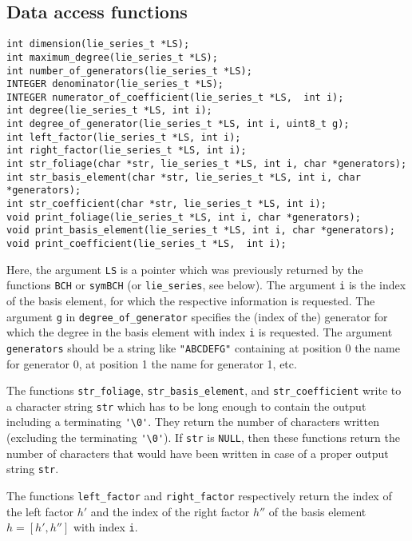 \documentclass[11pt,a4paper]{article}
\begin{document}
\subsection{Data access functions}
\begin{verbatim}
int dimension(lie_series_t *LS);
int maximum_degree(lie_series_t *LS);
int number_of_generators(lie_series_t *LS);
INTEGER denominator(lie_series_t *LS);
INTEGER numerator_of_coefficient(lie_series_t *LS,  int i);
int degree(lie_series_t *LS, int i);
int degree_of_generator(lie_series_t *LS, int i, uint8_t g);
int left_factor(lie_series_t *LS, int i);
int right_factor(lie_series_t *LS, int i);
int str_foliage(char *str, lie_series_t *LS, int i, char *generators);
int str_basis_element(char *str, lie_series_t *LS, int i, char *generators);
int str_coefficient(char *str, lie_series_t *LS, int i);
void print_foliage(lie_series_t *LS, int i, char *generators);
void print_basis_element(lie_series_t *LS, int i, char *generators);
void print_coefficient(lie_series_t *LS,  int i);
\end{verbatim}
Here, the argument \verb|LS| is a pointer which was
previously returned by the functions \verb|BCH| or \verb|symBCH|
(or \verb|lie_series|, see below).
The argument \verb|i| is the index of the basis element, for which
the respective information is requested.
The argument \verb|g| in \verb|degree_of_generator| specifies
the (index of the) generator for which the degree in the basis element with
index \verb|i| is requested.
The argument \verb|generators| should be a string like \verb|"ABCDEFG"| containing at 
position 0 the name for generator 0, at position 1 the name for generator 1, etc.

The functions \verb|str_foliage|, \verb|str_basis_element|, and \verb|str_coefficient| write
to a character string \verb|str| which has to be long enough 
to contain the output including a terminating \verb|'\0'|.
They return the number of characters written (excluding the terminating \verb|'\0'|).
If \verb|str| is \verb|NULL|, then these functions return the number
of characters that would have been written in case of a proper output
string \verb|str|.

The functions \verb|left_factor| and \verb|right_factor|
respectively
return the index of the left factor $h'$ and the index of the right
factor $h''$ of the basis element $h=[h',h'']$ with index \verb|i|.
\end{document}
